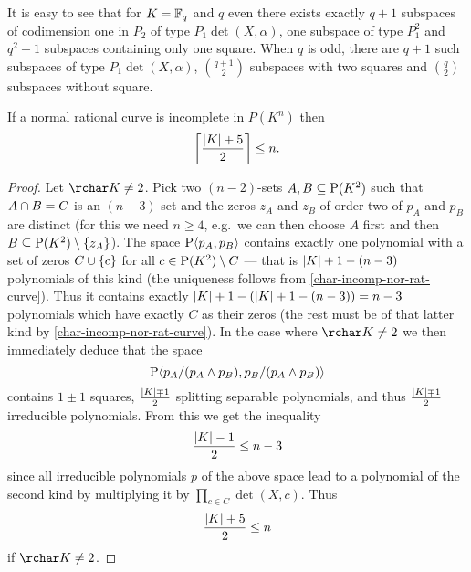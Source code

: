 \begin{remark}
    It is easy to see that for $K=\mathbb{F}_{q}$ and $q$ even there exists exactly $q + 1$ subspaces of codimension one in $P_2$ of type $P_1\det(X,\alpha)$, one subspace of type $P_1^2$ and $q^2-1$ subspaces containing only one square.
    When $q$ is odd, there are $q+1$ such subspaces of type $P_1\det(X,\alpha)$, $\binom {q+1} 2$ subspaces with two squares and $\binom q 2$ subspaces without square.  
\end{remark}

\begin{lemma}
    If a normal rational curve is incomplete in $P(K^n)$ then
    $$
    \left\lceil\frac{\left|K\right| + 5} 2\right\rceil\leq n.
    $$
\end{lemma}

\begin{proof}
    Let $\rchar K\neq 2$. Pick two $(n-2)$-sets $A,B\setleq \P(K^2)$ such that $A\cap B =C$ is an $(n-3)$-set and the zeros $z_A$ and $z_B$ of order two of $p_A$ and $p_B$ are distinct (for this we need $n\geq 4$, e.g.~we can then choose $A$ first and then $B\setleq \P(K^2)\setminus\set{z_A}$).
    The space $\P\gen{p_A,p_B}$ contains exactly one polynomial with a set of zeros $C\cup\left\{c\right\}$ for all $c\in\P(K^2)\setminus C$ --- that is $\left|K\right| + 1 - (n-3)$ polynomials of this kind (the uniqueness follows from \autoref{char-incomp-nor-rat-curve}). Thus it contains exactly $\left|K\right| + 1 - (\left|K\right| + 1 - (n-3))=n-3$ polynomials which have exactly $C$ as their zeros (the rest must be of that latter kind by \autoref{char-incomp-nor-rat-curve}). In the case where $\rchar K\neq 2$ we then immediately deduce that the space
    $$
    \P\gen{p_A/(p_A\meet p_B),p_B/(p_A\meet p_B)}
    $$
    contains $1\pm 1$ squares, $\frac{\left|K\right| \mp 1} 2$ splitting separable polynomials, and thus $\frac{\left|K\right| \mp 1} 2$ irreducible polynomials.
    From this we get the inequality
    $$
    \frac{\left|K\right| - 1} 2\leq n-3
    $$
    since all irreducible polynomials $p$ of the above space lead to a polynomial of the second kind by multiplying it by $\prod_{c\in C}{\det(X,c)}$. Thus
    $$
    \frac{\left|K\right| + 5} 2\leq n
    $$
    if $\rchar K\neq 2$.


\end{proof}
